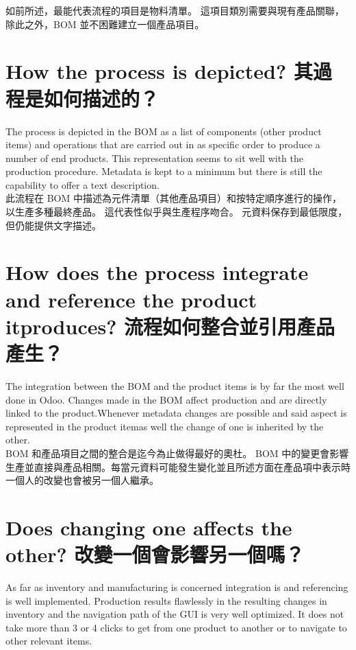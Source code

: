 \fontsize{12pt}{2.5pt}\selectfont
{如前所述，最能代表流程的項目是物料清單。 這項目類別需要與現有產品關聯，除此之外，BOM 並不困難建立一個產品項目。}\\[1pt]

\section{How the process is depicted? 其過程是如何描述的？}
\fontsize{12pt}{2.5pt}\selectfont 
{The process is depicted in the BOM as a list of components (other product items) and operations that are carried out in as specific order to produce a number of end products. This representation seems to sit well with the production procedure. Metadata is kept to a minimum but there is still the capability to offer a text description.}\\[1pt]

\fontsize{12pt}{2.5pt}\selectfont
{此流程在 BOM 中描述為元件清單（其他產品項目）和按特定順序進行的操作，以生產多種最終產品。 這代表性似乎與生產程序吻合。 元資料保存到最低限度，但仍能提供文字描述。}\\[1pt]

\section{How does the process integrate and reference the product itproduces? 流程如何整合並引用產品產生？}
\fontsize{12pt}{2.5pt}\selectfont 
{The integration between the BOM and the product items is by far the most well done in Odoo. Changes made in the BOM affect production and are directly linked to the product.Whenever metadata changes are possible and said aspect is represented in the product itemas well the change of one is inherited by the other.}\\[1pt]

\fontsize{12pt}{2.5pt}\selectfont
{BOM 和產品項目之間的整合是迄今為止做得最好的奧杜。 BOM 中的變更會影響生產並直接與產品相關。每當元資料可能發生變化並且所述方面在產品項中表示時一個人的改變也會被另一個人繼承。}\\[1pt]

\section{Does changing one affects the other? 改變一個會影響另一個嗎？}
\fontsize{12pt}{2.5pt}\selectfont 
{As far as inventory and manufacturing is concerned integration is and referencing is well implemented. Production results flawlessly in the resulting changes in inventory and the navigation path of the GUI is very well optimized. It does not take more than 3 or 4 clicks to get from one product to another or to navigate to other relevant items. }\\[1pt]

